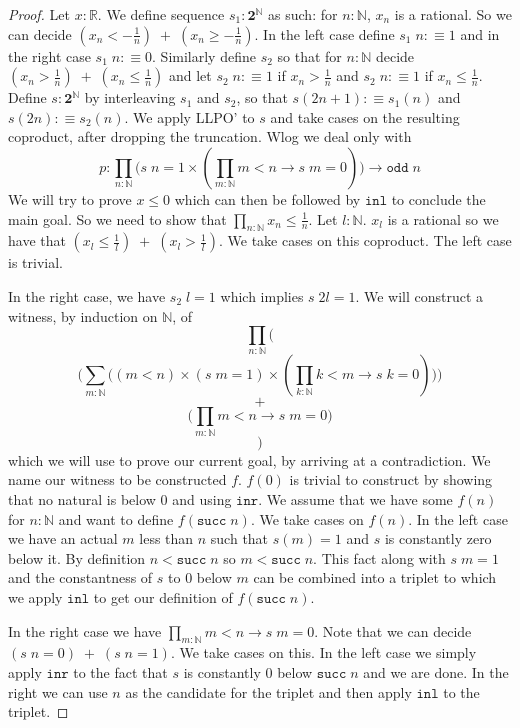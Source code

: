 \documentclass[12pt]{report}
\theoremstyle{definition}
\begin{document}
\begin{proof}
Let $x : \mathbb{R}$. 
We define sequence $s_{1} : \mathbf{2}^\mathbb{N}$ as such: for $n : \mathbb{N}$, $x_n$ is a rational. 
So we can decide $(x_n < -\frac{1}{n})\;+\;(x_n \geq -\frac{1}{n})$. 
In the left case define $s_1\; n :\equiv 1$ and in the right case $s_1\; n :\equiv 0$. 
Similarly define $s_2$ so that for $n : \mathbb{N}$ decide $(x_n > \frac{1}{n})\;+\;(x_n \leq \frac{1}{n})$ and let $s_2\;n:\equiv 1$ if $x_n > \frac{1}{n}$ and $s_2\;n :\equiv 1$ if 
$x_n \leq \frac{1}{n}$. 
Define $s : \mathbf{2}^\mathbb{N}$ by interleaving $s_1$ and $s_2$, so that $s(2n+1) :\equiv s_1(n)$ and $s(2n) :\equiv s_2(n)$. 
We apply LLPO' to $s$ and take cases on the resulting coproduct, after dropping the truncation. 
Wlog we deal only with 
$$p : \prod_{n : \mathbb{N}} \big( s\;n = 1 \times (\prod_{m : \mathbb{N}} m < n \rightarrow s\;m=0) \big) \rightarrow \mathtt{odd}\;n$$
We will try to prove $x \leq 0$ which can then be followed by $\mathtt{inl}$ to conclude the main goal. 
So we need to show that $\prod_{n : \mathbb{N}}x_n \leq \frac{1}{n}$. 
Let $l : \mathbb{N}$. $x_l$ is a rational so we have that $(x_l \leq \frac{1}{l})\;+\;(x_l > \frac{1}{l})$. 
We take cases on this coproduct. The left case is trivial. 

In the right case, we have $s_2\;l = 1$ which implies $s\;2l = 1$. 
We will construct a witness, by induction on $\mathbb{N}$, of 
$$\prod_{n : \mathbb{N}} \bigg($$
$$\Big(\sum_{m : \mathbb{N}}\big( (m < n) \times (s\;m = 1) \times (\prod_{k : \mathbb{N}} k < m \rightarrow s\;k = 0)\big)\Big)$$
$$+$$
$$ \big( \prod_{ m : \mathbb{N}} m < n \rightarrow s\;m = 0 \big) $$
$$\bigg)$$
which we will use to prove our current goal, by arriving at a contradiction. 
We name our witness to be constructed $f$. 
$f(0)$ is trivial to construct by showing that no natural is below $0$ and using $\mathtt{inr}$. 
We assume that we have some $f(n)$ for $n : \mathbb{N}$ and want to define $f(\mathtt{succ}\; n)$. 
We take cases on $f(n)$. 
In the left case we have an actual $m$ less than $n$ such that $s(m) = 1$ and $s$ is constantly zero below it. 
By definition $n < \mathtt{succ}\;n$ so $m < \mathtt{succ}\;n$. 
This fact along with $s\;m = 1$ and the constantness of $s$ to $0$ below $m$ can be combined into a triplet to which we apply $\mathtt{inl}$ to get our definition of $f(\mathtt{succ}\; n)$. 

In the right case we have $\prod_{ m : \mathbb{N}} m < n \rightarrow s\;m = 0$. 
Note that we can decide $(s\;n = 0)\;+\;(s\;n = 1)$. 
We take cases on this. 
In the left case we simply apply $\mathtt{inr}$ to the fact that $s$ is constantly $0$ below $\mathtt{succ}\;n$ and we are done. 
In the right we can use $n$ as the candidate for the triplet and then apply $\mathtt{inl}$ to the triplet. 


\end{proof}
\end{document}

